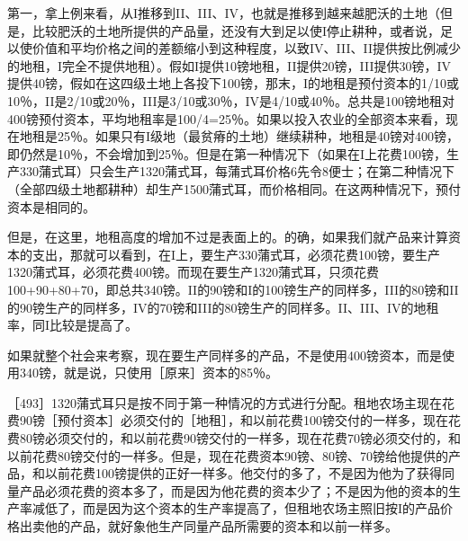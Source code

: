 第一，拿上例来看，从I推移到II、III、IV，也就是推移到越来越肥沃的土地（但是，比较肥沃的土地所提供的产品量，还没有大到足以使I停止耕种，或者说，足以使价值和平均价格之间的差额缩小到这种程度，以致IV、III、II提供按比例减少的地租，I完全不提供地租）。假如I提供10镑地租，II提供20镑，III提供30镑，IV提供40镑，假如在这四级土地上各投下100镑，那末，I的地租是预付资本的1/10或10％，II是2/10或20％，III是3/10或30％，IV是4/10或40％。总共是100镑地租对400镑预付资本，平均地租率是100/4=25％。如果以投入农业的全部资本来看，现在地租是25％。如果只有I级地（最贫瘠的土地）继续耕种，地租是40镑对400镑，即仍然是10％，不会增加到25％。但是在第一种情况下（如果在I上花费100镑，生产330蒲式耳）只会生产1320蒲式耳，每蒲式耳价格6先令8便士；在第二种情况下（全部四级土地都耕种）却生产1500蒲式耳，而价格相同。在这两种情况下，预付资本是相同的。

但是，在这里，地租高度的增加不过是表面上的。的确，如果我们就产品来计算资本的支出，那就可以看到，在I上，要生产330蒲式耳，必须花费100镑，要生产1320蒲式耳，必须花费400镑。而现在要生产1320蒲式耳，只须花费100+90+80+70，即总共340镑。II的90镑和I的100镑生产的同样多，III的80镑和II的90镑生产的同样多，IV的70镑和III的80镑生产的同样多。II、III、IV的地租率，同I比较是提高了。

如果就整个社会来考察，现在要生产同样多的产品，不是使用400镑资本，而是使用340镑，就是说，只使用［原来］资本的85％。

［493］1320蒲式耳只是按不同于第一种情况的方式进行分配。租地农场主现在花费90镑［预付资本］必须交付的［地租］，和以前花费100镑交付的一样多，现在花费80镑必须交付的，和以前花费90镑交付的一样多，现在花费70镑必须交付的，和以前花费80镑交付的一样多。但是，现在花费资本90镑、80镑、70镑给他提供的产品，和以前花费100镑提供的正好一样多。他交付的多了，不是因为他为了获得同量产品必须花费的资本多了，而是因为他花费的资本少了；不是因为他的资本的生产率减低了，而是因为这个资本的生产率提高了，但租地农场主照旧按I的产品价格出卖他的产品，就好象他生产同量产品所需要的资本和以前一样多。

